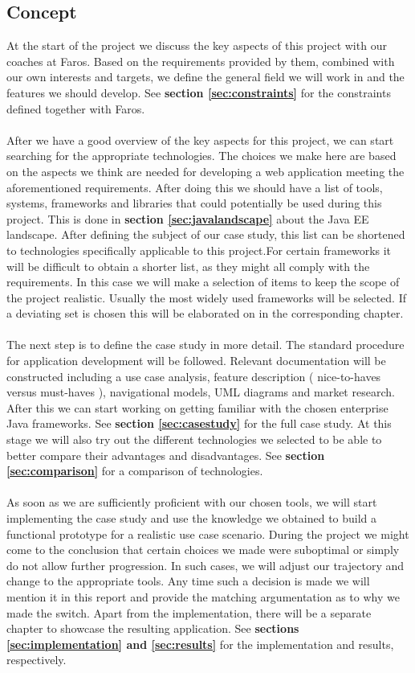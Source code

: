 \documentclass[12pt]{article}
\begin{document}
\begin{multicols}{2}
\subsection{Concept}\label{sec:concept}
At the start of the project we discuss the key aspects of this project with our coaches at Faros. Based on the requirements provided by them, combined with our own interests and targets, we define the general field we will work in and the features we should develop. See \textbf{section \ref{sec:constraints}} for the constraints defined together with Faros.
\\\\
After we have a good overview of the key aspects for this project, we can start searching for the appropriate technologies. The choices we make here are based on the aspects we think are needed for developing a web application meeting the aforementioned requirements. After doing this we should have a list of tools, systems, frameworks and libraries that could potentially be used during this project. This is done in \textbf{section \ref{sec:javalandscape}} about the Java EE landscape. After defining the subject of our case study, this list can be shortened to technologies specifically applicable to this project.For certain frameworks it will be difficult to obtain a shorter list, as they might all comply with the requirements. In this case we will make a selection of items to keep the scope of the project realistic. Usually the most widely used frameworks will be selected. If a deviating set is chosen this will be elaborated on in the corresponding chapter. 
\\\\
The next step is to define the case study in more detail. The standard procedure for application development will be followed. Relevant documentation will be constructed including a use case analysis, feature description ( nice-to-haves versus must-haves ), navigational models, UML diagrams and market research. After this we can start working on getting familiar with the chosen enterprise Java frameworks. See \textbf{section \ref{sec:casestudy}} for the full case study. At this stage we will also try out the different technologies we selected to be able to better compare their advantages and disadvantages. See \textbf{section \ref{sec:comparison}} for a comparison of technologies.
\\\\
As soon as we are sufficiently proficient with our chosen tools, we will start implementing the case study and use the knowledge we obtained to build a functional prototype for a realistic use case scenario. During the project we might come to the conclusion that certain choices we made were suboptimal or simply do not allow further progression. In such cases, we will adjust our trajectory and change to the appropriate tools. Any time such a decision is made we will mention it in this report and provide the matching argumentation as to why we made the switch. Apart from the implementation, there will be a separate chapter to showcase the resulting application. See \textbf{sections \ref{sec:implementation} and \ref{sec:results}} for the implementation and results, respectively.

\end{multicols}
\end{document}
